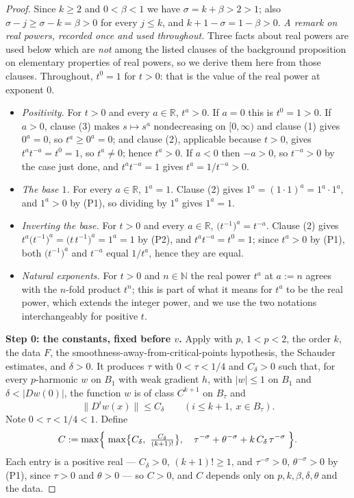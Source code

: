 \begin{proof}
Since $k\ge2$ and $0<\beta<1$ we have $\sigma=k+\beta>2>1$; also
$\sigma-j\ge\sigma-k=\beta>0$ for every $j\le k$, and $k+1-\sigma=1-\beta>0$.
\medskip\noindent\emph{A remark on real powers, recorded once and used throughout.}  Three
facts about real powers are used below which are \emph{not} among the listed clauses of the
background proposition on elementary properties of real powers, so we derive them here from
those clauses.  Throughout, $t^{0}=1$ for $t>0$: that is the value of the real power at
exponent $0$.
\begin{itemize}
\item[(P1)] \emph{Positivity.}  For $t>0$ and every $a\in\mathbb{R}$, $t^{a}>0$.  If $a=0$ this
is $t^{0}=1>0$.  If $a>0$, clause (3) makes $s\mapsto s^{a}$ nondecreasing on $[0,\infty)$ and
clause (1) gives $0^{a}=0$, so $t^{a}\ge0^{a}=0$; and clause (2), applicable because $t>0$,
gives $t^{a}t^{-a}=t^{0}=1$, so $t^{a}\ne0$; hence $t^{a}>0$.  If $a<0$ then $-a>0$, so
$t^{-a}>0$ by the case just done, and $t^{a}t^{-a}=1$ gives $t^{a}=1/t^{-a}>0$.
\item[(P2)] \emph{The base $1$.}  For every $a\in\mathbb{R}$, $1^{a}=1$.  Clause (2) gives
$1^{a}=(1\cdot1)^{a}=1^{a}\cdot1^{a}$, and $1^{a}>0$ by (P1), so dividing by $1^{a}$ gives
$1^{a}=1$.
\item[(P3)] \emph{Inverting the base.}  For $t>0$ and every $a\in\mathbb{R}$,
$\bigl(t^{-1}\bigr)^{a}=t^{-a}$.  Clause (2) gives
$t^{a}\bigl(t^{-1}\bigr)^{a}=\bigl(t\,t^{-1}\bigr)^{a}=1^{a}=1$ by (P2), and
$t^{a}t^{-a}=t^{0}=1$; since $t^{a}>0$ by (P1), both $\bigl(t^{-1}\bigr)^{a}$ and $t^{-a}$
equal $1/t^{a}$, hence they are equal.
\item[(P4)] \emph{Natural exponents.}  For $t>0$ and $n\in\mathbb{N}$ the real power $t^{a}$ at
$a:=n$ agrees with the $n$-fold product $t^{n}$; this is part of what it means for $t^{a}$ to be
the real power, which extends the integer power, and we use the two notations
interchangeably for positive $t$.
\end{itemize}


\medskip\noindent\textbf{Step 0: the constants, fixed before $v$.}
Apply  with $p$, $1<p<2$, the order $k$, the data $F$, the
smoothness-away-from-critical-points hypothesis, the Schauder estimates, and $\delta>0$.  It
produces $\tau$ with $0<\tau<1/4$ and $C_\delta>0$ such that, for every $p$-harmonic $w$ on
$B_1$ with weak gradient $h$, with $\lvert w\rvert\le1$ on $B_1$ and
$\delta<\lvert Dw(0)\rvert$, the function $w$ is of class $C^{k+1}$ on $B_\tau$ and
\begin{equation}\label{eq:afc-nc}
  \bigl\lVert D^{i}w(x)\bigr\rVert\le C_\delta\qquad(i\le k+1,\ x\in B_\tau).
\end{equation}
Note $0<\tau<1/4<1$.  Define
\[
  C:=\max\Bigl\{\;\max\bigl\{C_\delta,\ \tfrac{C_\delta}{(k+1)!}\bigr\},\quad
    \tau^{-\sigma}+\theta^{-\sigma}+k\,C_\delta\,\tau^{-\sigma}\;\Bigr\}.
\]
Each entry is a positive real --- $C_\delta>0$, $(k+1)!\ge1$, and $\tau^{-\sigma}>0$,
$\theta^{-\sigma}>0$ by (P1), since $\tau>0$ and $\theta>0$ --- so $C>0$, and $C$ depends only on
$p,k,\beta,\delta,\theta$ and the data.


\end{proof}
